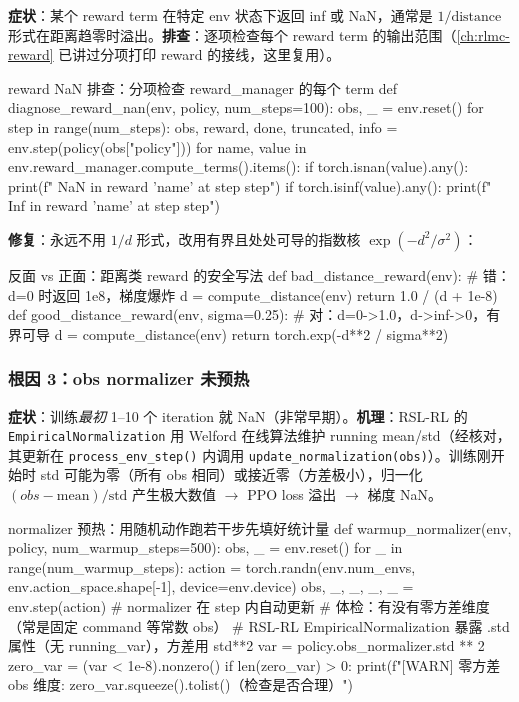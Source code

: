 \textbf{症状}：某个 reward term 在特定 env 状态下返回 inf 或 NaN，通常是 $1/\text{distance}$ 形式在距离趋零时溢出。\textbf{排查}：逐项检查每个 reward term 的输出范围（\cref{ch:rlmc-reward} 已讲过分项打印 reward 的接线，这里复用）。

\begin{codebox}[Python]{reward NaN 排查：分项检查 reward\_manager 的每个 term}
def diagnose_reward_nan(env, policy, num_steps=100):
    obs, _ = env.reset()
    for step in range(num_steps):
        obs, reward, done, truncated, info = env.step(policy(obs["policy"]))
        for name, value in env.reward_manager.compute_terms().items():
            if torch.isnan(value).any():
                print(f"  NaN in reward '{name}' at step {step}")
            if torch.isinf(value).any():
                print(f"  Inf in reward '{name}' at step {step}")
\end{codebox}

\textbf{修复}：永远不用 $1/d$ 形式，改用有界且处处可导的指数核 $\exp(-d^2/\sigma^2)$：

\begin{codebox}[Python]{反面 vs 正面：距离类 reward 的安全写法}
def bad_distance_reward(env):       # 错：d=0 时返回 1e8，梯度爆炸
    d = compute_distance(env)
    return 1.0 / (d + 1e-8)
def good_distance_reward(env, sigma=0.25):   # 对：d=0->1.0，d->inf->0，有界可导
    d = compute_distance(env)
    return torch.exp(-d**2 / sigma**2)
\end{codebox}

\subsubsection{根因 3：obs normalizer 未预热}

\textbf{症状}：训练\emph{最初} 1--10 个 iteration 就 NaN（非常早期）。\textbf{机理}：RSL-RL 的 \verb|EmpiricalNormalization| 用 Welford 在线算法维护 running mean/std（经核对，其更新在 \verb|process_env_step()| 内调用 \verb|update_normalization(obs)|）\cite{schwarke2025rslrl}。训练刚开始时 std 可能为零（所有 obs 相同）或接近零（方差极小），归一化 $(obs-\text{mean})/\text{std}$ 产生极大数值 $\to$ PPO loss 溢出 $\to$ 梯度 NaN。

\begin{codebox}[Python]{normalizer 预热：用随机动作跑若干步先填好统计量}
def warmup_normalizer(env, policy, num_warmup_steps=500):
    obs, _ = env.reset()
    for _ in range(num_warmup_steps):
        action = torch.randn(env.num_envs, env.action_space.shape[-1], device=env.device)
        obs, _, _, _, _ = env.step(action)            # normalizer 在 step 内自动更新
    # 体检：有没有零方差维度（常是固定 command 等常数 obs）
    # RSL-RL EmpiricalNormalization 暴露 .std 属性（无 running_var），方差用 std**2
    var = policy.obs_normalizer.std ** 2
    zero_var = (var < 1e-8).nonzero()
    if len(zero_var) > 0:
        print(f"[WARN] 零方差 obs 维度: {zero_var.squeeze().tolist()}（检查是否合理）")
\end{codebox}

